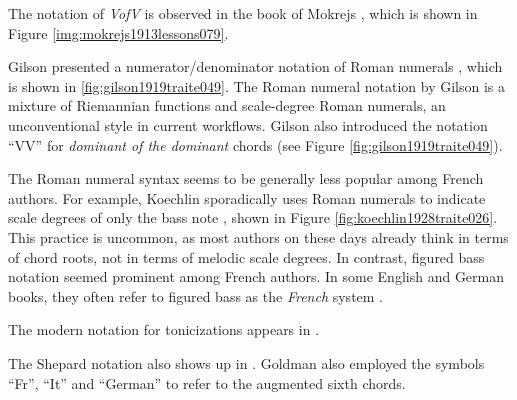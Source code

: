 The notation of \emph{VofV} is observed in the book of Mokrejs \cite{mokrejs1913lessons}, which is shown in Figure \ref{img:mokrejs1913lessons079}.

Gilson presented a numerator/denominator notation of Roman numerals \cite{gilson1919traite}, which is shown in \ref{fig:gilson1919traite049}.
The Roman numeral notation by Gilson is a mixture of Riemannian functions and scale-degree Roman numerals, an unconventional style in current workflows.
Gilson also introduced the notation ``VV'' for \emph{dominant of the dominant} chords (see Figure \ref{fig:gilson1919traite049}).

The Roman numeral syntax seems to be generally less popular among French authors.
For example, Koechlin sporadically uses Roman numerals to indicate scale degrees of only the bass note \cite{koechlin1928traite}, shown in Figure \ref{fig:koechlin1928traite026}.
This practice is uncommon, as most authors on these days already think in terms of chord roots, not in terms of melodic scale degrees.
In contrast, figured bass notation seemed prominent among French authors.
In some English and German books, they often refer to figured bass as the \emph{French} system .

The modern notation for tonicizations appears in \cite{tischler1964practical}.

The Shepard notation also shows up in \cite{goldman1965harmony}.
Goldman also employed the symbols ``Fr'', ``It'' and ``German'' to refer to the augmented sixth chords.



